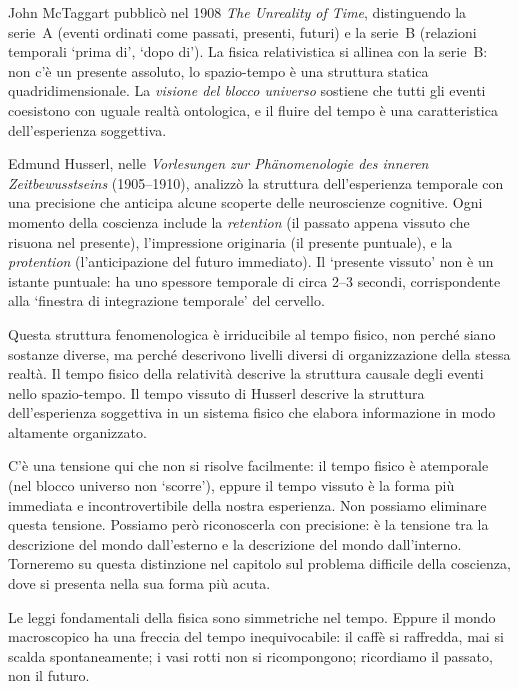 \documentclass[12pt,a4paper,openany]{book}
\newcommand{\sezione}[1]{\vspace{1.2em}{\large\bfseries #1}\vspace{0.5em}\par}
\begin{document}
\sezione{McTaggart, Husserl, e le due nature del tempo}

John McTaggart pubblicò nel 1908 \textit{The Unreality of Time}, distinguendo la serie~A (eventi ordinati come passati, presenti, futuri) e la serie~B (relazioni temporali `prima di', `dopo di'). La fisica relativistica si allinea con la serie~B: non c'è un presente assoluto, lo spazio-tempo è una struttura statica quadridimensionale. La \textit{visione del blocco universo} sostiene che tutti gli eventi coesistono con uguale realtà ontologica, e il fluire del tempo è una caratteristica dell'esperienza soggettiva.

Edmund Husserl, nelle \textit{Vorlesungen zur Phänomenologie des inneren Zeitbewusstseins} (1905--1910), analizzò la struttura dell'esperienza temporale con una precisione che anticipa alcune scoperte delle neuroscienze cognitive. Ogni momento della coscienza include la \textit{retention} (il passato appena vissuto che risuona nel presente), l'impressione originaria (il presente puntuale), e la \textit{protention} (l'anticipazione del futuro immediato). Il `presente vissuto' non è un istante puntuale: ha uno spessore temporale di circa 2--3 secondi, corrispondente alla `finestra di integrazione temporale' del cervello.

Questa struttura fenomenologica è irriducibile al tempo fisico, non perché siano sostanze diverse, ma perché descrivono livelli diversi di organizzazione della stessa realtà. Il tempo fisico della relatività descrive la struttura causale degli eventi nello spazio-tempo. Il tempo vissuto di Husserl descrive la struttura dell'esperienza soggettiva in un sistema fisico che elabora informazione in modo altamente organizzato.

C'è una tensione qui che non si risolve facilmente: il tempo fisico è atemporale (nel blocco universo non `scorre'), eppure il tempo vissuto è la forma più immediata e incontrovertibile della nostra esperienza. Non possiamo eliminare questa tensione. Possiamo però riconoscerla con precisione: è la tensione tra la descrizione del mondo dall'esterno e la descrizione del mondo dall'interno. Torneremo su questa distinzione nel capitolo sul problema difficile della coscienza, dove si presenta nella sua forma più acuta.

\sezione{La freccia del tempo: Boltzmann e la specialità del passato}

Le leggi fondamentali della fisica sono simmetriche nel tempo. Eppure il mondo macroscopico ha una freccia del tempo inequivocabile: il caffè si raffredda, mai si scalda spontaneamente; i vasi rotti non si ricompongono; ricordiamo il passato, non il futuro.
\end{document}
